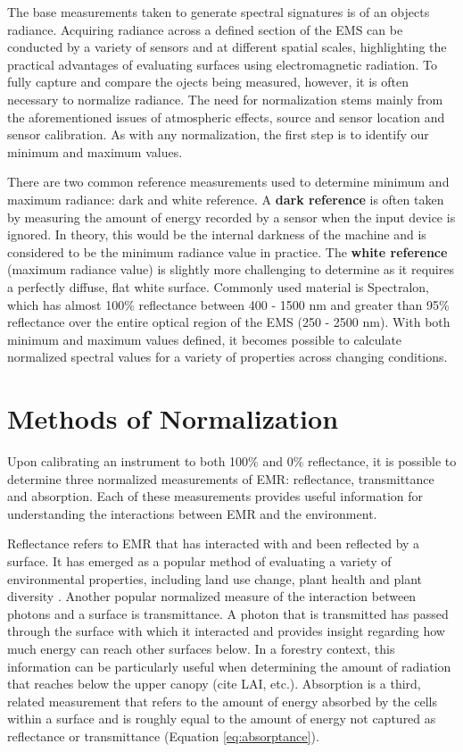\documentclass[
]{book}
\begin{document}
The base measurements taken to generate spectral signatures is of an objects radiance. Acquiring radiance across a defined section of the EMS can be conducted by a variety of sensors and at different spatial scales, highlighting the practical advantages of evaluating surfaces using electromagnetic radiation. To fully capture and compare the ojects being measured, however, it is often necessary to normalize radiance. The need for normalization stems mainly from the aforementioned issues of atmospheric effects, source and sensor location and sensor calibration. As with any normalization, the first step is to identify our minimum and maximum values.

There are two common reference measurements used to determine minimum and maximum radiance: dark and white reference. A \textbf{dark reference} is often taken by measuring the amount of energy recorded by a sensor when the input device is ignored. In theory, this would be the internal darkness of the machine and is considered to be the minimum radiance value in practice. The \textbf{white reference} (maximum radiance value) is slightly more challenging to determine as it requires a perfectly diffuse, flat white surface. Commonly used material is Spectralon, which has almost 100\% reflectance between 400 - 1500 nm and greater than 95\% reflectance over the entire optical region of the EMS (250 - 2500 nm). With both minimum and maximum values defined, it becomes possible to calculate normalized spectral values for a variety of properties across changing conditions.

\section{Methods of Normalization}\label{methods-of-normalization}

Upon calibrating an instrument to both 100\% and 0\% reflectance, it is possible to determine three normalized measurements of EMR: reflectance, transmittance and absorption. Each of these measurements provides useful information for understanding the interactions between EMR and the environment.

Reflectance refers to EMR that has interacted with and been reflected by a surface. It has emerged as a popular method of evaluating a variety of environmental properties, including land use change, plant health and plant diversity \citep{asner_spectroscopy_2011}. Another popular normalized measure of the interaction between photons and a surface is transmittance. A photon that is transmitted has passed through the surface with which it interacted and provides insight regarding how much energy can reach other surfaces below. In a forestry context, this information can be particularly useful when determining the amount of radiation that reaches below the upper canopy (cite LAI, etc.). Absorption is a third, related measurement that refers to the amount of energy absorbed by the cells within a surface and is roughly equal to the amount of energy not captured as reflectance or transmittance (Equation \eqref{eq:absorptance}).
\end{document}
